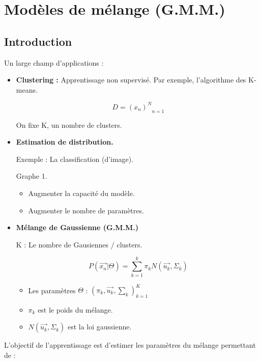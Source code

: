 \documentclass{article}
\begin{document}
\section{Modèles de mélange (G.M.M.)}

\subsection{Introduction}

Un large champ d'applications :

\begin{itemize}

\item \textbf{Clustering :} Apprentissage non supervisé. Par exemple, l'algorithme des K-means.

\[ D = {(x_n)^N}_{n=1}  \]

On fixe K, un nombre de clusters.

\item \textbf{Estimation de distribution.}

Exemple : La classification (d'image).

Graphe 1.

\begin{itemize}
\item Augmenter la capacité du modèle.
\item Augmenter le nombre de paramètres.
\end{itemize}

\item \textbf{Mélange de Gaussienne (G.M.M.)}

K : Le nombre de Gausiennes / clusters.

\[ P(\vec{x_n} | \Theta) = \sum_{k=1}^k \pi_k N(\vec{u_k}, \Sigma_k) \]

\begin{itemize}

\item Les paramètres $\Theta$ : $(\pi_k, \vec{u_k}, \sum_k)_{k=1}^K$

\item $\pi_k$ est le poids du mélange.

\item $N(\vec{u_k}, \Sigma_k)$ est la loi gaussienne.

\end{itemize}

\end{itemize}

L'objectif de l'apprentissage est d'estimer les paramètres du mélange permettant de :
\end{document}
